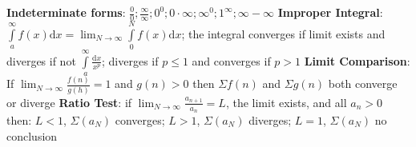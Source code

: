 \documentclass[twoside]{article}
\begin{document}
\textbf{Indeterminate forms}:\newline
\indent $\frac{0}{0};  \frac{\infty}{\infty};  0^0;  0\cdot\infty;  \infty^0;  1^{\infty};  \infty - \infty$\newline
\textbf{Improper Integral}:\newline
\indent $\displaystyle \int\limits_a^\infty f(x)\mathrm{d}x = \lim_{N \to \infty} \int\limits_0^N f(x)\mathrm{d}x$; the integral converges if limit exists and diverges if not\newline
\indent $\displaystyle \int\limits_a^\infty \frac{\mathrm{d}x}{x^p}$; diverges if $p \leq 1$ and converges if $p>1$\newline
\textbf{Limit Comparison}:\newline
\indent If $\displaystyle \lim_{N \to \infty}\frac{f(n)}{g(h)} = 1$ and $g(n) > 0$ then $\Sigma{f(n)}$ and $\Sigma{g(n)}$ both converge or diverge\newline
\textbf{Ratio Test}:\newline
\indent if $\displaystyle \lim_{N \to \infty}\frac{a_{n+1}}{a_n} = L$, the limit exists, and all $a_n >0$ then:\newline
\indent \indent $L<1$, $\Sigma(a_N)$ converges; $L>1$, $\Sigma(a_N)$ diverges; $L=1$, $\Sigma(a_N)$ no conclusion\newline
\end{document}
